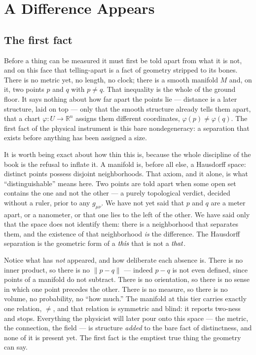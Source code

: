 \chapter{A Difference Appears}

\section{The first fact}

Before a thing can be measured it must first be told apart from what it is not, and on this face that telling-apart is a fact
of geometry stripped to its bones. There is no metric yet, no length, no clock; there is a smooth manifold $M$ and, on it,
two points $p$ and $q$ with $p \neq q$. That inequality is the whole of the ground floor. It says nothing about how far
apart the points lie --- distance is a later structure, laid on top --- only that the smooth structure already tells them
apart, that a chart $\varphi : U \to \mathbb{R}^n$ assigns them different coordinates, $\varphi(p) \neq \varphi(q)$. The
first fact of the physical instrument is this bare nondegeneracy: a separation that exists before anything has been assigned
a size.

It is worth being exact about how thin this is, because the whole discipline of the book is the refusal to inflate it. A
manifold is, before all else, a Hausdorff space: distinct points possess disjoint neighborhoods. That axiom, and it alone,
is what ``distinguishable'' means here. Two points are told apart when some open set contains the one and not the other ---
a purely topological verdict, decided without a ruler, prior to any $g_{\mu\nu}$. We have not yet said that $p$ and $q$ are a
meter apart, or a nanometer, or that one lies to the left of the other. We have said only that the space does not identify
them: there is a neighborhood that separates them, and the existence of that neighborhood \emph{is} the difference. The
Hausdorff separation is the geometric form of a $\emph{this}$ that is not a $\emph{that}$.

Notice what has \emph{not} appeared, and how deliberate each absence is. There is no inner product, so there is no
$\lVert p - q \rVert$ --- indeed $p - q$ is not even defined, since points of a manifold do not subtract. There is no
orientation, so there is no sense in which one point precedes the other. There is no measure, so there is no volume, no
probability, no ``how much.'' The manifold at this tier carries exactly one relation, $\neq$, and that relation is symmetric
and blind: it reports two-ness and stops. Everything the physicist will later pour onto this space --- the metric, the
connection, the field --- is structure \emph{added} to the bare fact of distinctness, and none of it is present yet. The
first fact is the emptiest true thing the geometry can say.

